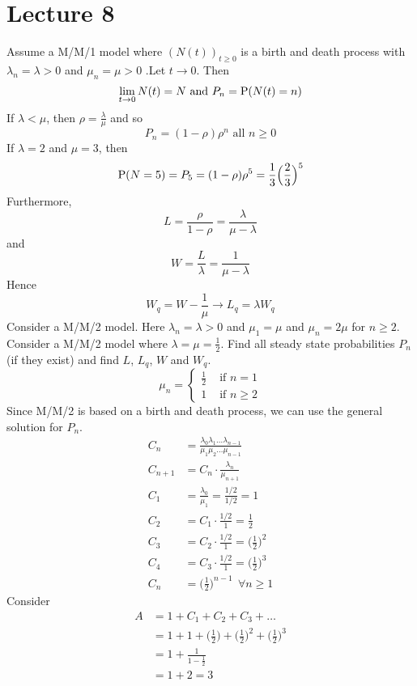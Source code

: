 \documentclass[12pt]{article}
\begin{document}
\section{Lecture 8} 
Assume a M/M/1 model where $(N(t))_{t \geq 0}$ is a birth and death process with $\lambda_n = \lambda > 0$ and $\mu_n = \mu > 0$ .Let $t \to 0$. Then $$\lim_{t\to 0} N(t) = N \text{ and } P_n = \mathrm{P}( N(t) = n ) $$ 
If $\lambda < \mu$, then $\rho = \frac{\lambda}{\mu}$ and so $$P_n = (1-\rho)\rho^n \text{ all } n \geq 0 $$ 
If $\lambda = 2$ and $\mu = 3$, then $$\mathrm{P}( N = 5 ) = P_5 = (1-\rho)\rho^5 = \frac{1}{3}\Big(\frac{2}{3}\Big)^5 $$ 
Furthermore, $$L = \frac{\rho}{1 -\rho} = \frac{\lambda}{\mu - \lambda}$$
and $$ W = \frac{L}{\lambda} = \frac{1}{\mu - \lambda} $$ 
Hence $$W_q = W - \frac{1}{\mu} \to L_q = \lambda W_q $$ 
Consider a M/M/2 model. Here $\lambda_n = \lambda > 0$ and $\mu_1 = \mu$ and $\mu_n = 2\mu$ for $n \geq 2$. \\
Consider a M/M/2 model where $\lambda = \mu = \frac{1}{2}$. Find all steady state probabilities $P_n$ (if they exist) and find $L$, $L_q$, $W$ and $W_q$. 
$$\mu_n = \begin{cases} \frac{1}{2} &\text{ if } n = 1 \\ 1 &\text{ if } n \geq 2 \end{cases} $$ 
Since M/M/2 is based on a birth and death process, we can use the general solution for $P_n$. 
$$ \begin{aligned} C_n &= \frac{\lambda_0\lambda_1\dots\lambda_{n-1}}{\mu_1\mu_2\dots\mu_{n-1}} \\ C_{n+1} &= C_n \cdot \frac{\lambda_n}{\mu_{n+1}} \\ C_1 &= \frac{\lambda_0}{\mu_1} = \frac{1/2}{1/2} = 1 \\ C_2 &= C_1 \cdot \frac{1/2}{1} = \frac{1}{2} \\ C_3 &= C_2 \cdot \frac{1/2}{1} = \Big(\frac{1}{2}\Big)^2 \\ C_4 &= C_3 \cdot \frac{1/2}{1} = \Big(\frac{1}{2}\Big)^3 \\ C_n &= \Big(\frac{1}{2}\Big)^{n-1} ~~\forall n \geq 1 \end{aligned} $$ Consider $$ \begin{aligned} A &= 1 + C_1 + C_2 + C_3 + \dots \\ &= 1 + 1 + \Big(\frac{1}{2}\Big) + \Big(\frac{1}{2}\Big)^2 + \Big(\frac{1}{2}\Big)^3 \\ &= 1 + \frac{1}{1 - \frac{1}{2}} \\ &= 1 + 2 = 3 \end{aligned} $$ 
\end{document}
